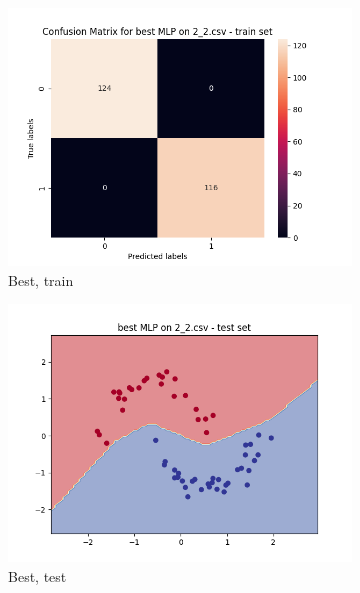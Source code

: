 \documentclass[12pt]{article}
\newcommand*{\subfigwidth}{0.24\textwidth}
\begin{document}
\begin{figure}[H]
\begin{subfigure}[t]{\subfigwidth}
        \includegraphics[width=\linewidth]{img/exp_2/mlp/2_2/best/train_matrix.png}
        \caption{Best, train}
    \end{subfigure}
    \hfill
    \begin{subfigure}[t]{\subfigwidth}
        \includegraphics[width=\linewidth]{img/exp_2/mlp/2_2/best/test_boundary.png}
        \caption{Best, test}
    \end{subfigure}
    \hfill
    \begin{subfigure}[t]{\subfigwidth}

\end{subfigure}
\end{figure}
\end{document}
